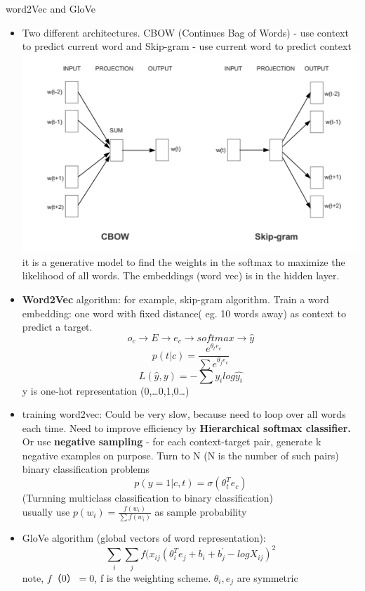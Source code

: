 \documentclass[11pt, openany]{book}              %
\begin{document}
word2Vec and GloVe

\begin{itemize}
	\item Two different architectures. CBOW (Continues Bag of Words) - use context to predict current word and Skip-gram - use current word to predict context
	\includegraphics[width=15cm]{CBOW-SkipGram.png}
	 it is a generative model to find the weights in the softmax to maximize the likelihood of all words. The embeddings (word vec) is in the hidden layer.
	\item \textbf{Word2Vec} algorithm: for example, skip-gram algorithm. Train a word embedding: one word with fixed distance( eg. 10 words away) as context to predict a target. 
		$$ o_c \rightarrow E \rightarrow e_c \rightarrow softmax \rightarrow \hat{y}$$
		$$p(t|c) = \frac{e^{\theta_t e_c}}{\sum e^{\theta_j e_c}}$$
		$$L(\hat{y},y )= - \sum y_i log \hat{y_i}$$
		y is one-hot representation (0,…0,1,0…)
	\item training word2vec: Could be very slow, because need to loop over all words each time. Need to improve efficiency by \textbf{Hierarchical softmax classifier.} Or use \textbf{negative sampling} - for each context-target pair, generate k negative examples on purpose. Turn to N (N is the number of such pairs) binary classification problems 
		$$p(y = 1 | c, t ) = \sigma( \theta_t^T e_c)$$
		(Turnning multiclass classification to binary classification)\\ 
		usually use $p(w_i) = \frac{f(w_i)}{\sum f (w_i)}$ as sample probability 
	\item GloVe algorithm (global vectors of word representation):
		$$\sum_i \sum_j f(x_{ij} (\theta_i ^ T e_j + b_i + b_j^’ - log X_{ij})^2$$ note, $f（0）= 0$, f is the weighting scheme. $\theta_i, e_j$ are symmetric
\end{itemize}
\end{document}
